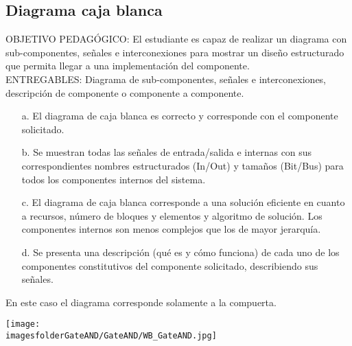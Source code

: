 \subsection{Diagrama caja blanca}
\scriptsize
	\begin{tcolorbox}[enhanced,title=PRODUCTO DE CALIDAD:,colframe=colorA1,colback=colorA2,arc=0mm,colbacktitle=white,fonttitle=\bfseries,coltitle=white,attach boxed title to top left={xshift=3.2mm,yshift=-0.50mm},boxed title style={skin=enhancedfirst jigsaw,size=small,arc=0mm,bottom=1mm,interior style={fill=none,top color=color2,bottom color=color2},,boxrule=0pt},boxrule=0pt]
		OBJETIVO PEDAGÓGICO: El estudiante es capaz de realizar un diagrama con sub-componentes, señales e interconexiones para mostrar un diseño estructurado que permita llegar a una implementación del componente.\\
		ENTREGABLES: Diagrama de sub-componentes, señales e interconexiones, descripción de componente o componente a componente.
		\begin{enumerate}
			\item[a.] El diagrama de caja blanca es correcto y corresponde con el componente solicitado. 
			\item[b.] Se muestran todas las señales de entrada/salida e internas con sus correspondientes nombres estructurados (In/Out) y tamaños (Bit/Bus) para todos los componentes internos del sistema.
			\item[c.] El diagrama de caja blanca corresponde a una solución eficiente en cuanto a recursos, número de bloques y elementos y algoritmo de solución. Los componentes internos son menos complejos que los de mayor jerarquía.
			\item[d.] Se presenta una descripción (qué es y cómo funciona) de cada uno de los componentes constitutivos del componente solicitado, describiendo sus señales.
		\end{enumerate}
	\end{tcolorbox}

\normalsize

		En este caso el diagrama corresponde solamente a la compuerta.
		\begin{center}
			\texttt{[image: \\imagesfolderGateAND/GateAND/WB\_GateAND.jpg]}
		\end{center}
